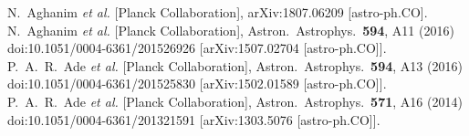 \documentclass[aps,prd,amsmath,amssymb,showpacs,floats,floatfix,nofootinbib,reprint]{revtex4-1}
\begin{document}
%
%

\begin{thebibliography}{99}
  N.~Aghanim {\it et al.} [Planck Collaboration],
  arXiv:1807.06209 [astro-ph.CO].
  N.~Aghanim {\it et al.} [Planck Collaboration],
  Astron.\ Astrophys.\  {\bf 594}, A11 (2016)
  doi:10.1051/0004-6361/201526926
  [arXiv:1507.02704 [astro-ph.CO]].
  P.~A.~R.~Ade {\it et al.} [Planck Collaboration],
  Astron.\ Astrophys.\  {\bf 594}, A13 (2016)
  doi:10.1051/0004-6361/201525830
  [arXiv:1502.01589 [astro-ph.CO]].
  P.~A.~R.~Ade {\it et al.} [Planck Collaboration],
  Astron.\ Astrophys.\  {\bf 571}, A16 (2014)
  doi:10.1051/0004-6361/201321591
  [arXiv:1303.5076 [astro-ph.CO]].


\end{thebibliography}
\end{document}
